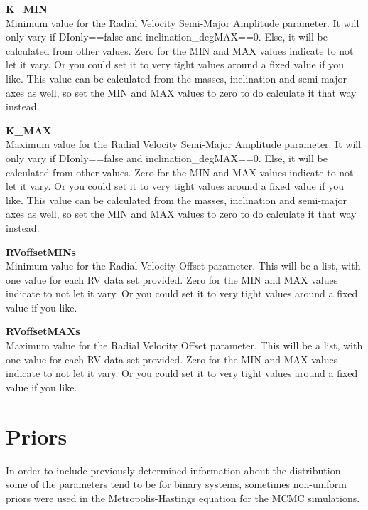 \documentclass[12pt,preprint]{aastex}
\begin{document}
{\bf K\_MIN}\\
Minimum value for the Radial Velocity Semi-Major Amplitude parameter.  It will only vary if DIonly==false and inclination\_degMAX==0.  Else, it will be calculated from other values.
Zero for the MIN and MAX values indicate to not let it vary.  Or you could set it to very tight values around a fixed value if you like.  This value can be calculated from the masses, inclination and semi-major axes as well, so set the MIN and MAX values to zero to do calculate it that way instead.

{\bf K\_MAX}\\
Maximum value for the Radial Velocity Semi-Major Amplitude parameter.  It will only vary if DIonly==false and inclination\_degMAX==0.  Else, it will be calculated from other values.
Zero for the MIN and MAX values indicate to not let it vary.  Or you could set it to very tight values around a fixed value if you like.  This value can be calculated from the masses, inclination and semi-major axes as well, so set the MIN and MAX values to zero to do calculate it that way instead.

{\bf RVoffsetMINs}\\
Minimum value for the Radial Velocity Offset parameter.  This will be a list, with one value for each RV data set provided.
Zero for the MIN and MAX values indicate to not let it vary.  Or you could set it to very tight values around a fixed value if you like.

{\bf RVoffsetMAXs}\\
Maximum value for the Radial Velocity Offset parameter.  This will be a list, with one value for each RV data set provided.
Zero for the MIN and MAX values indicate to not let it vary.  Or you could set it to very tight values around a fixed value if you like.



\section{Priors}\label{sec:priors}

In order to include previously determined information about the distribution some of the parameters tend to be for binary systems, sometimes non-uniform priors were used in the Metropolis-Hastings equation for the MCMC simulations.
\end{document}
